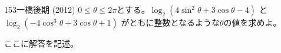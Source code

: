 \begin{thm}{153}{\maru}{一橋後期 (2012)}
 $0\le\theta\le 2\pi$とする。$\log_2 (4\sin^2\theta+3\cos\theta-4)$ と $\log_2 (-4\cos^3\theta+3\cos\theta+1)$ がともに整数となるような$\theta$の値を求めよ。
\end{thm}

ここに解答を記述。